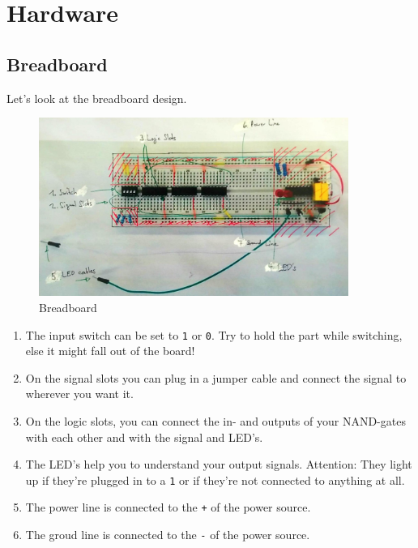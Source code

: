 \documentclass[10pt,a4paper]{article}
\begin{document}
\newpage

\section{Hardware}

\subsection{Breadboard}
Let's look at the breadboard design.
    \begin{figure}[H]
      \centering
      \includegraphics[width=0.9\textwidth]{breadboard_labeled}%
      \caption{Breadboard}%
      \label{fig:breadboard_labelled}
    \end{figure}

\begin{enumerate}
 \item The input switch can be set to \texttt{1} or \texttt{0}. Try to hold the part while switching, else it might fall out of the board!
 \item On the signal slots you can plug in a jumper cable and connect the signal to wherever you want it.
 \item On the logic slots, you can connect the in- and outputs of your NAND-gates with each other and with the signal and LED's. 
 \item The LED's help you to understand your output signals. Attention: They light up if they're plugged in to a \texttt{1} or if they're not connected to anything at all. 
 \item The power line is connected to the \texttt{+} of the power source.
 \item The groud line is connected to the \texttt{-} of the power source. 
\end{enumerate}


\newpage
\end{document}
